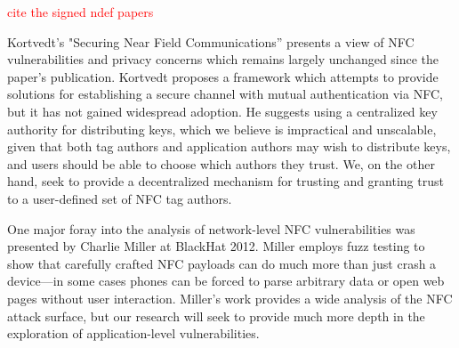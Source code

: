 \documentclass[12pt]{article}
\newcommand\TODO[1]{\textcolor{red}{#1}}
\begin{document}
\TODO{cite the signed ndef papers}

Kortvedt's "Securing Near Field Communications''\cite{kortvedt2009} presents a view of NFC vulnerabilities and privacy concerns which remains largely unchanged since the paper's publication.
Kortvedt proposes a framework which attempts to provide solutions for establishing a secure channel with mutual authentication via NFC, but it has not gained widespread adoption.
He suggests using a centralized key authority for distributing keys, which we believe is impractical and unscalable, given that both tag authors and application authors may wish to distribute keys, and users should be able to choose which authors they trust.
We, on the other hand, seek to provide a decentralized mechanism for trusting and granting trust to a user-defined set of NFC tag authors.

One major foray into the analysis of network-level NFC vulnerabilities was presented by Charlie Miller at BlackHat 2012\cite{miller2012}.
Miller employs fuzz testing to show that carefully crafted NFC payloads can do much more than just crash a device---in some cases phones can be forced to parse arbitrary data or open web pages without user interaction.
Miller's work provides a wide analysis of the NFC attack surface, but our research will seek to provide much more depth in the exploration of application-level vulnerabilities.
\end{document}

